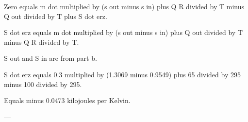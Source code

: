 Zero equals m dot multiplied by (s out minus s in) plus Q R divided by T minus Q out divided by T plus S dot erz.  

S dot erz equals m dot multiplied by (s out minus s in) plus Q out divided by T minus Q R divided by T.  

S out and S in are from part b.  

S dot erz equals 0.3 multiplied by (1.3069 minus 0.9549) plus 65 divided by 295 minus 100 divided by 295.  

Equals minus 0.0473 kilojoules per Kelvin.  

---